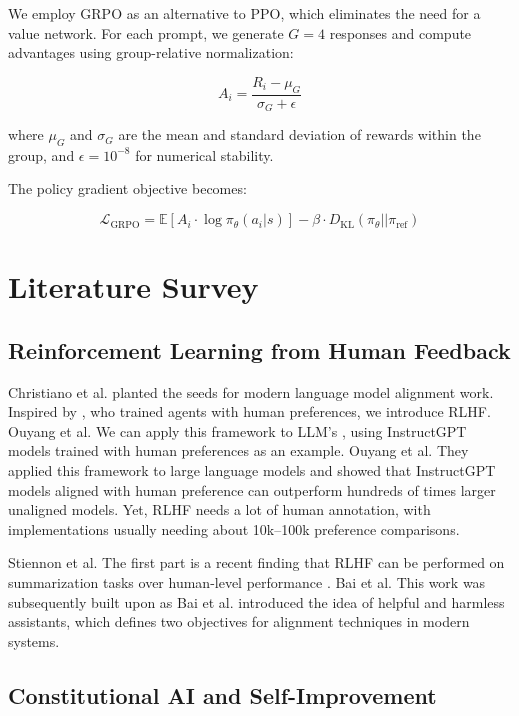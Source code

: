 \documentclass[conference]{IEEEtran}
\begin{document}
We employ GRPO as an alternative to PPO, which eliminates the need for a value network. For each prompt, we generate $G=4$ responses and compute advantages using group-relative normalization:

\begin{equation}
A_i = \frac{R_i - \mu_G}{\sigma_G + \epsilon}
\end{equation}

where $\mu_G$ and $\sigma_G$ are the mean and standard deviation of rewards within the group, and $\epsilon=10^{-8}$ for numerical stability.

The policy gradient objective becomes:

\begin{equation}
\mathcal{L}_{\text{GRPO}} = \mathbb{E} \left[ A_i \cdot \log \pi_\theta(a_i | s) \right] - \beta \cdot D_{\text{KL}}(\pi_\theta || \pi_{\text{ref}})
\end{equation}


\section{Literature Survey}

\subsection{Reinforcement Learning from Human Feedback}

Christiano et al. planted the seeds for modern language model alignment work. Inspired by \cite{christiano2017deep}, who trained agents with human preferences, we introduce RLHF. Ouyang et al. We can apply this framework to LLM's , using InstructGPT models trained with human preferences as an example. Ouyang et al. They applied this framework to large language models \cite{ouyang2022training} and showed that InstructGPT models aligned with human preference can outperform hundreds of times larger unaligned models. Yet, RLHF needs a lot of human annotation, with implementations usually needing about 10k–100k preference comparisons.

Stiennon et al. The first part is a recent finding that RLHF can be performed on summarization tasks over human-level performance \cite{stiennon2020learning}. Bai et al. This work was subsequently built upon as Bai et al. \cite{bai2022training} introduced the idea of helpful and harmless assistants, which defines two objectives for alignment techniques in modern systems.

\subsection{Constitutional AI and Self-Improvement}
\end{document}
